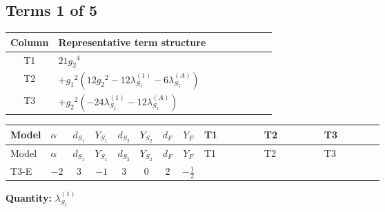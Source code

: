 \documentclass[8pt]{article}
\begin{document}
\begin{landscape}
\subsection*{Terms 1 of 5}
\begin{center}
\begin{tabular}{@{}c >{\raggedright\arraybackslash}p{0.82\linewidth}@{}}
\toprule
Column & Representative term structure \\
\midrule
T1 & \(\displaystyle 21 {g_2}^4\) \\
\midrule
T2 & \(\displaystyle +{g_1}^2 \left(12 {g_2}^2-12 {\lambda_{S_1}^{(1)}}-6 {\lambda_{S_1}^{(A)}}\right)\) \\
\midrule
T3 & \(\displaystyle +{g_2}^2 (-24 {\lambda_{S_1}^{(1)}}-12 {\lambda_{S_1}^{(A)}})\) \\
\midrule
\bottomrule
\end{tabular}
\end{center}
\smallskip
\tiny
\begin{longtable}{@{}llcccccc >{\raggedright\arraybackslash}p{0.21\linewidth} >{\raggedright\arraybackslash}p{0.21\linewidth} >{\raggedright\arraybackslash}p{0.21\linewidth}@{}}
\toprule
Model & $\alpha$ & $d_{S_1}$ & $Y_{S_1}$ & $d_{S_2}$ & $Y_{S_2}$ & $d_F$ & $Y_F$ & T1 & T2 & T3 \\
\midrule
\endfirsthead
\toprule
Model & $\alpha$ & $d_{S_1}$ & $Y_{S_1}$ & $d_{S_2}$ & $Y_{S_2}$ & $d_F$ & $Y_F$ & T1 & T2 & T3 \\
\midrule
\endhead
T3-E & $-2$ & $3$ & $-1$ & $3$ & $0$ & $2$ & $-\frac{1}{2}$ & \scriptsize\adjustbox{max width=\linewidth}{$\begin{gathered} 21 {g_2}^4\end{gathered}$} & \scriptsize\adjustbox{max width=\linewidth}{$\begin{gathered} +{g_1}^2 \left(12 {g_2}^2-12 {\lambda_{S_1}^{(1)}}-6 {\lambda_{S_1}^{(A)}}\right)\end{gathered}$} & \scriptsize\adjustbox{max width=\linewidth}{$\begin{gathered} +{g_2}^2 (-24 {\lambda_{S_1}^{(1)}}-12 {\lambda_{S_1}^{(A)}})\end{gathered}$} \\
\midrule
\bottomrule
\end{longtable}
\clearpage
\noindent\textbf{Quantity: }$\lambda_{S_1}^{(1)}$\par\smallskip

\end{landscape}
\end{document}
